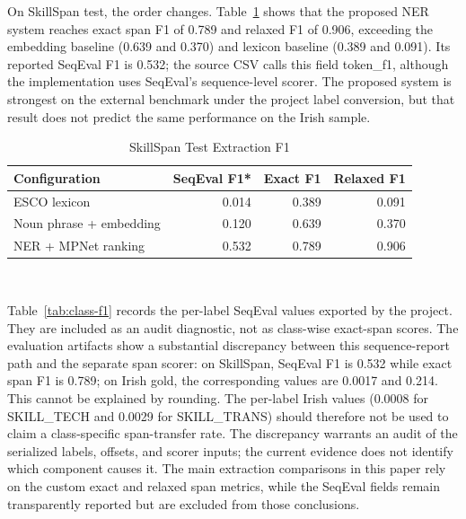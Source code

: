 \documentclass[conference]{IEEEtran}
\begin{document}
On SkillSpan test, the order changes. Table~\ref{tab:skillspan} shows that the proposed NER system reaches exact span F1 of 0.789 and relaxed F1 of 0.906, exceeding the embedding baseline (0.639 and 0.370) and lexicon baseline (0.389 and 0.091). Its reported SeqEval F1 is 0.532; the source CSV calls this field \textsf{token\_f1}, although the implementation uses SeqEval's sequence-level scorer. The proposed system is strongest on the external benchmark under the project label conversion, but that result does not predict the same performance on the Irish sample.

\begin{table}[!t]
\caption{SkillSpan Test Extraction F1}
\label{tab:skillspan}
\centering
\small
\begin{tabular}{p{2.5cm}rrr}
\toprule
Configuration & SeqEval F1* & Exact F1 & Relaxed F1 \\
\midrule
ESCO lexicon & 0.014 & 0.389 & 0.091 \\
Noun phrase + embedding & 0.120 & 0.639 & 0.370 \\
NER + MPNet ranking & 0.532 & 0.789 & 0.906 \\
\bottomrule
\end{tabular}
\\[1mm]
\par{}
\end{table}

Table~\ref{tab:class-f1} records the per-label SeqEval values exported by the project. They are included as an audit diagnostic, not as class-wise exact-span scores. The evaluation artifacts show a substantial discrepancy between this sequence-report path and the separate span scorer: on SkillSpan, SeqEval F1 is 0.532 while exact span F1 is 0.789; on Irish gold, the corresponding values are 0.0017 and 0.214. This cannot be explained by rounding. The per-label Irish values (0.0008 for \textsf{SKILL\_TECH} and 0.0029 for \textsf{SKILL\_TRANS}) should therefore not be used to claim a class-specific span-transfer rate. The discrepancy warrants an audit of the serialized labels, offsets, and scorer inputs; the current evidence does not identify which component causes it. The main extraction comparisons in this paper rely on the custom exact and relaxed span metrics, while the SeqEval fields remain transparently reported but are excluded from those conclusions.
\end{document}
